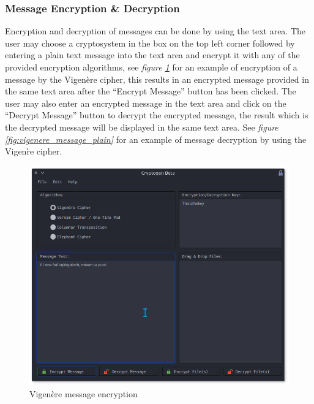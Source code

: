 \documentclass[11pt]{article}
\begin{document}
	\subsubsection{Message Encryption \& Decryption}
	Encryption and decryption of messages can be done by using the text area. The user may choose a cryptosystem in the box on the top left corner followed by entering a plain text message into the text area and encrypt it with any of the provided encryption algorithms, see \textit{figure  \ref{fig:vigenere_message_cipher}} for an example of encryption of a message by the Vigen\`ere cipher, this results in an encrypted message provided in the same text area after the ``Encrypt Message'' button has been clicked. The user may also enter an encrypted message in the text area and click on the ``Decrypt Message'' button to decrypt the encrypted message, the result which is the decrypted message will be displayed in the same text area. See \textit{figure \ref{fig:vigenere_message_plain}} for an example of message decryption by using the Vigen\`re cipher.\\

\begin{figure}[!htb]
\centering
\includegraphics[scale=0.55]{vigenere_message_cipher}
\caption{Vigen\`ere message encryption} %
\label{fig:vigenere_message_cipher} %
\end{figure}
\end{document}
